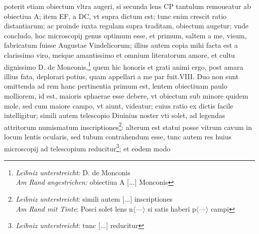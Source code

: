 \pend \pstart [p.~153] [...] poterit etiam obiectum vltra augeri, si secunda lens\protect{} CP tantulum remoueatur ab obiectiua\protect{} A; item EF, a DC, vt supra dictum est; tunc enim crescit ratio distantiarum; ac proinde iuxta regulam supra traditam, obiectum augetur; vnde concludo, hoc microscopij\protect{} genus optimum esse, et primum, saltem a me, visum, fabricatum fuisse Augustae Vindelicorum\protect{}; illius autem copia mihi facta est a clarissimo viro, meique amantissimo et omnium literatorum amore, et cultu dignissimo D. de Monconis\protect{},\footnote{\textit{Leibniz unterstreicht:} D. de Monconis\\ \textit{Am Rand angestrichen:} obiectiua A [...] Monconis} quem hic honoris et grati animi ergo, post amara illius fata, deplorari potius, quam appellari a me par fuit.\pend \pstart  VIII. Duo non sunt omittenda ad rem hanc pertinentia primum est, lentem obiectiuam\protect{} paulo molliorem, id est, maioris sphaerae esse debere, vt obiectum sub minore quidem mole, sed cum maiore campo, vt aiunt, videatur; cuius ratio ex dictis facile intelligitur; simili autem telescopio\protect{} Diuinius\protect{} noster vti solet, ad legendas attritorum numismatum inscriptiones\footnote{\textit{Leibniz unterstreicht}: simili autem [...] inscriptiones\\
\textit{Am Rand mit Tinte}: Posci solet lens\protect{} n$\langle$---$\rangle$ si satis haberi p$\langle$---$\rangle$ campi}: alterum est statui posse vitrum\protect{} cavum in locum lentis\protect{} ocularis, sed tubum contrahendum esse, tunc autem res huius microscopij\protect{} ad telescopium\protect{} reducitur\footnote{\textit{Leibniz unterstreicht}: tunc [...] reducitur}; et eodem modo 